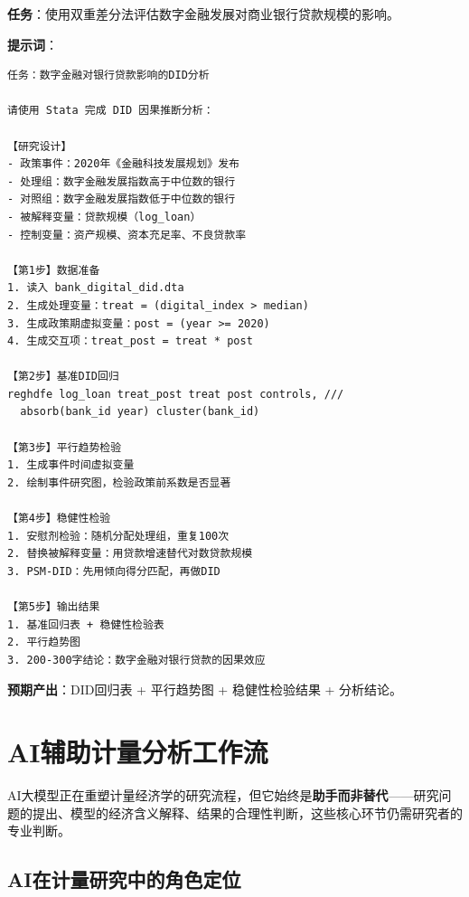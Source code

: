 \begin{practicebox}[实操：DID评估数字金融对银行贷款的影响]
\textbf{任务}：使用双重差分法评估数字金融发展对商业银行贷款规模的影响。

\textbf{提示词}：

\begin{lstlisting}
任务：数字金融对银行贷款影响的DID分析

请使用 Stata 完成 DID 因果推断分析：

【研究设计】
- 政策事件：2020年《金融科技发展规划》发布
- 处理组：数字金融发展指数高于中位数的银行
- 对照组：数字金融发展指数低于中位数的银行
- 被解释变量：贷款规模（log_loan）
- 控制变量：资产规模、资本充足率、不良贷款率

【第1步】数据准备
1. 读入 bank_digital_did.dta
2. 生成处理变量：treat = (digital_index > median)
3. 生成政策期虚拟变量：post = (year >= 2020)
4. 生成交互项：treat_post = treat * post

【第2步】基准DID回归
reghdfe log_loan treat_post treat post controls, ///
  absorb(bank_id year) cluster(bank_id)

【第3步】平行趋势检验
1. 生成事件时间虚拟变量
2. 绘制事件研究图，检验政策前系数是否显著

【第4步】稳健性检验
1. 安慰剂检验：随机分配处理组，重复100次
2. 替换被解释变量：用贷款增速替代对数贷款规模
3. PSM-DID：先用倾向得分匹配，再做DID

【第5步】输出结果
1. 基准回归表 + 稳健性检验表
2. 平行趋势图
3. 200-300字结论：数字金融对银行贷款的因果效应
\end{lstlisting}

\textbf{预期产出}：DID回归表 + 平行趋势图 + 稳健性检验结果 + 分析结论。
\end{practicebox}

\section{AI辅助计量分析工作流}

AI大模型正在重塑计量经济学的研究流程，但它始终是\textbf{助手而非替代}——研究问题的提出、模型的经济含义解释、结果的合理性判断，这些核心环节仍需研究者的专业判断。

\subsection{AI在计量研究中的角色定位}

